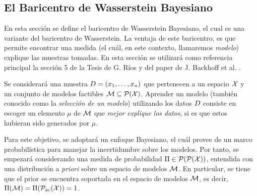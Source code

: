 {{		\subsection*{El Baricentro de Wasserstein Bayesiano}\label{ssec:baricentro-Wasserstein-Bayesiano}
		{
			En esta sección se define el baricentro de Wasserstein Bayesiano, el cual es una variante del baricentro de Wasserstein. La ventaja de este baricentro, es que permite encontrar una medida (el cuál, en este contexto, llamaremos \emph{modelo}) explique las muestras tomadas.
			En esta sección se utilizará como referencia principal la sección 5 de la Tesis de G. Ríos \cite{rios2020contributions} y del paper de J. Backhoff et al.  \cite{backhoff2022bayesian}.

			Se considerará una muestra $\Data = \left(x_1,\ldots, x_n \right)$ que pertenecen a un espacio $\cX$ y un conjunto de modelos factibles
			$\Models \subseteq \ProbSpace[\cX]$. Aprender un modelo (también conocido como la \emph{selección de un modelo}) utilizando los datos $\Data$  consiste en escoger un elemento $\mu$ de $\Models$ que \emph{mejor explique los datos}, si es que estos hubieran sido generados por $\mu$.

			Para este objetivo, se adoptará un enfoque Bayesiano, el cuál provee de un marco probabilística para manejar la incertidumbre sobre los modelos. Por tanto, se empezará considerando una medida de probabilidad $\Pi \in \ProbSpace[\ProbSpace[\cX] ] $, entendida con una distribución a \textit{priori} sobre un espacio de modelos $\Models$. En particular, se tiene que el prior se encuentra soportada en el espacio de modelos $\Models$, es decir, $\Pi(\Models) = \Pi(\ProbSpaceAC[\cX] ) = 1$.

}}}
